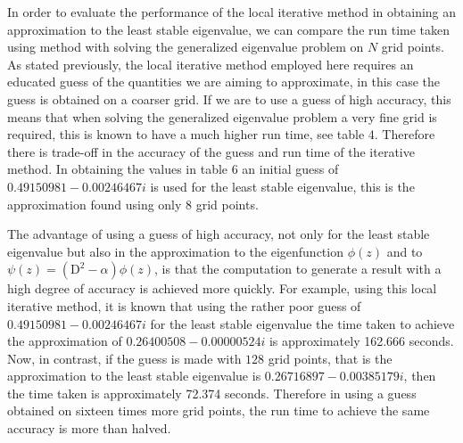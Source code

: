 \documentclass[a4paper, 12pt, twoside, openright]{article}
\numberwithin{equation}{section}
\begin{document}
In order to evaluate the performance of the local iterative method in obtaining an approximation to the least stable eigenvalue, we can compare the run time taken using method with solving the generalized eigenvalue problem on $N$ grid points. As stated previously, the local iterative method employed here requires an educated guess of the quantities we are aiming to approximate, in this case the guess is obtained on a coarser grid. If we are to use a guess of high accuracy, this means that when solving the generalized eigenvalue problem a very fine grid is required, this is known to have a much higher run time, see table 4. Therefore there is trade-off in the accuracy of the guess and run time of the iterative method. In obtaining the values in table 6 an initial guess of $0.49150981 - 0.00246467i$ is used for the least stable eigenvalue, this is the approximation found using only $8$ grid points. %

The advantage of using a guess of high accuracy, not only for the least stable eigenvalue but also in the approximation to the eigenfunction $\phi(z)$ and to $\psi(z)=(\mathrm{D}^2-\alpha)\phi(z)$, is that the computation to generate a result with a high degree of accuracy is achieved more quickly. For example, using this local iterative method, it is known that using the rather poor guess of $0.49150981 - 0.00246467i$ for the least stable eigenvalue the time taken to achieve the approximation of $0.26400508 - 0.00000524i$ is approximately 162.666 seconds. Now, in contrast, if the guess is made with $128$ grid points, that is the approximation to the least stable eigenvalue is $0.26716897 - 0.00385179i$, then the time taken is approximately 72.374 seconds. Therefore in using a guess obtained on sixteen times more grid points, the run time to achieve the same accuracy is more than halved. %
\end{document}
